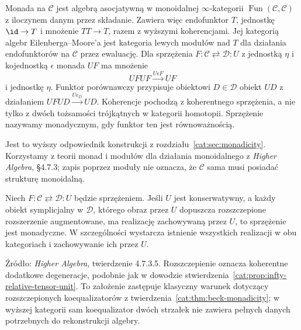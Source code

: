 \begin{definicja}\label{cat:def:infty-monad}
Monada na $\mathcal C$ jest algebrą asocjatywną w monoidalnej $\infty$-kategorii $\operatorname{Fun}(\mathcal C,\mathcal C)$ z iloczynem danym przez składanie. Zawiera więc endofunktor $T$, jednostkę $\id\to T$ i mnożenie $TT\to T$, razem z wyższymi koherencjami. Jej kategorią algebr Eilenberga--Moore'a jest kategoria lewych modułów nad $T$ dla działania endofunktorów na $\mathcal C$ przez ewaluację. Dla sprzężenia $F:\mathcal C\rightleftarrows\mathcal D:U$ z jednostką $\eta$ i kojednostką $\epsilon$ monada $UF$ ma mnożenie
\[
 UFUF\xrightarrow{U\epsilon F}UF
\]
i jednostkę $\eta$. Funktor porównawczy przypisuje obiektowi $D\in\mathcal D$ obiekt $UD$ z działaniem $UFUD\xrightarrow{U\epsilon_D}UD$. Koherencje pochodzą z koherentnego sprzężenia, a nie tylko z dwóch tożsamości trójkątnych w kategorii homotopii. Sprzężenie nazywamy monadycznym, gdy funktor ten jest równoważnością.
\end{definicja}

Jest to wyższy odpowiednik konstrukcji z rozdziału~\ref{cat:sec:monadicity}. Korzystamy z teorii monad i modułów dla działania monoidalnego z \emph{Higher Algebra}, \S4.7.3; zapis poprzez moduły nie oznacza, że $\mathcal C$ sama musi posiadać strukturę monoidalną.

\begin{twierdzenie}\label{cat:thm:infty-barr-beck}
Niech $F:\mathcal C\rightleftarrows\mathcal D:U$ będzie sprzężeniem. Jeśli $U$ jest konserwatywny, a każdy obiekt symplicjalny w $\mathcal D$, którego obraz przez $U$ dopuszcza rozszczepione rozszerzenie augmentowane, ma realizację zachowywaną przez $U$, to sprzężenie jest monadyczne. W szczególności wystarcza istnienie wszystkich realizacji w obu kategoriach i zachowywanie ich przez $U$.
\end{twierdzenie}

Źródło: \emph{Higher Algebra}, twierdzenie 4.7.3.5. Rozszczepienie oznacza koherentne dodatkowe degeneracje, podobnie jak w dowodzie stwierdzenia~\ref{cat:prop:infty-relative-tensor-unit}. To założenie zastępuje klasyczny warunek dotyczący rozszczepionych koequalizatorów z twierdzenia~\ref{cat:thm:beck-monadicity}; w wyższej kategorii sam koequalizator dwóch strzałek nie zawiera pełnych danych potrzebnych do rekonstrukcji algebry.

